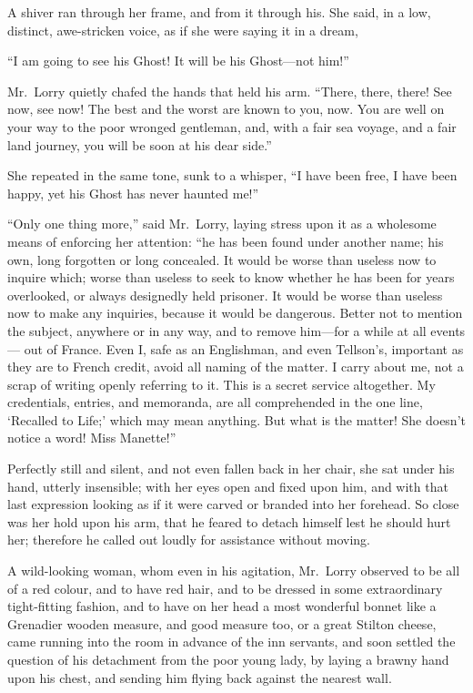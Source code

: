 A shiver ran through her frame, and from it through his.  She said,
in a low, distinct, awe-stricken voice, as if she were saying it in a
dream,

``I am going to see his Ghost!  It will be his Ghost---not him!''

Mr.\ Lorry quietly chafed the hands that held his arm.  ``There, there,
there!  See now, see now! The best and the worst are known to you, now.
You are well on your way to the poor wronged gentleman, and, with a fair
sea voyage, and a fair land journey, you will be soon at his dear side.''

She repeated in the same tone, sunk to a whisper, ``I have been free,
I have been happy, yet his Ghost has never haunted me!''

``Only one thing more,'' said Mr.\ Lorry, laying stress upon it as a
wholesome means of enforcing her attention:  ``he has been found under
another name; his own, long forgotten or long concealed.  It would be
worse than useless now to inquire which; worse than useless to seek
to know whether he has been for years overlooked, or always designedly
held prisoner.  It would be worse than useless now to make any inquiries,
because it would be dangerous.  Better not to mention the subject,
anywhere or in any way, and to remove him---for a while at all events---%
out of France.  Even I, safe as an Englishman, and even Tellson's,
important as they are to French credit, avoid all naming of the
matter.  I carry about me, not a scrap of writing openly referring to
it.  This is a secret service altogether.  My credentials, entries,
and memoranda, are all comprehended in the one line, `Recalled to
Life;' which may mean anything.  But what is the matter!  She doesn't
notice a word!  Miss Manette!''

Perfectly still and silent, and not even fallen back in her chair,
she sat under his hand, utterly insensible; with her eyes open and
fixed upon him, and with that last expression looking as if it were
carved or branded into her forehead.  So close was her hold upon his
arm, that he feared to detach himself lest he should hurt her;
therefore he called out loudly for assistance without moving.

A wild-looking woman, whom even in his agitation, Mr.\ Lorry observed
to be all of a red colour, and to have red hair, and to be dressed in
some extraordinary tight-fitting fashion, and to have on her head a
most wonderful bonnet like a Grenadier wooden measure, and good
measure too, or a great Stilton cheese, came running into the room in
advance of the inn servants, and soon settled the question of his
detachment from the poor young lady, by laying a brawny hand upon his
chest, and sending him flying back against the nearest wall.

